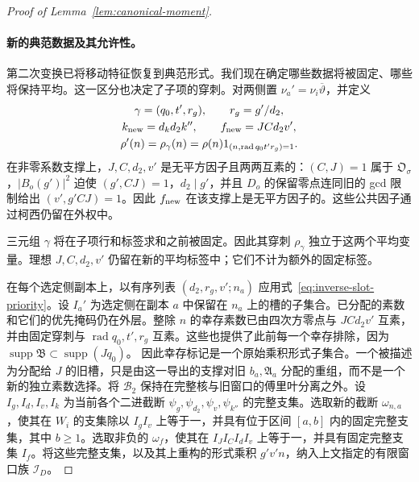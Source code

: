\documentclass[11pt,a4paper]{article}
\numberwithin{equation}{section}
\numberwithin{figure}{section}
\theoremstyle{definition}
\theoremstyle{remark}
\begin{document}
\begin{proof}[Proof of Lemma~\ref{lem:canonical-moment}]
\paragraph{新的典范数据及其允许性。}
第二次变换已将移动特征恢复到典范形式。我们现在确定哪些数据将被固定、哪些将保持平均。这一区分也决定了子项的穿刺。对两侧置 \(\nu_a'=\nu_i\overline\vartheta\)，并定义
\begin{equation}\label{eq:canonical-child-data}
 \begin{gathered}
 \gamma=(q_0,t',r_g),\qquad r_g=g'/d_2,\\
 k_{\rm new}=d_kd_2k'',\qquad f_{\rm new}=JCd_2v',\\
 \rho'(n)=\rho_\gamma(n)=\rho(n)1_{(n,\operatorname{rad}q_0t'r_g)=1}.
 \end{gathered}
\end{equation}
在非零系数支撑上，\(J,C,d_2,v'\) 是无平方因子且两两互素的：\((C,J)=1\) 属于 \(\mathfrak O_\sigma\)，\(|B_o(g')|^2\) 迫使 \((g',CJ)=1\)，\(d_2\mid g'\)，并且 \(D_o\) 的保留零点连同旧的 gcd 限制给出
\((v',g'CJ)=1\)。因此 \(f_{\rm new}\) 在该支撑上是无平方因子的。这些公共因子通过柯西仍留在外权中。

三元组 \(\gamma\) 将在子项行和标签求和之前被固定。因此其穿刺 \(\rho_\gamma\) 独立于这两个平均变量。理想 \(J,C,d_2,v'\) 仍留在新的平均标签中；它们不计为额外的固定标签。

在每个选定侧副本上，以有序列表 \((d_2,r_g,v';n_a)\) 应用式~\eqref{eq:inverse-slot-priority}。设 \(I_a'\) 为选定侧在副本 \(a\) 中保留在 \(n_a\) 上的槽的子集合。已分配的素数和它们的优先掩码仍在外层。整除 \(n\) 的幸存素数已由四次方零点与 \(JCd_2v'\) 互素，并由固定穿刺与
\(\operatorname{rad}q_0,t',r_g\) 互素。这些也提供了此前每一个幸存排除，因为
\(\operatorname{supp}\mathfrak B\subset\operatorname{supp}(Jq_0)\)。
因此幸存标记是一个原始乘积形式子集合。一个被描述为分配给 \(J\) 的旧槽，只是由这一导出的支撑对旧 \(b_a,\mathfrak A_a\) 分配的重组，而不是一个新的独立素数选择。将 \(\mathcal B_2\) 保持在完整核与旧窗口的傅里叶分离之外。设 \(I_g,I_d,I_v,I_k\) 为当前各个二进截断 \(\psi_g,\psi_{d_2},\psi_v,\psi_{k''}\) 的完整支集。选取新的截断 \(\omega_{n,a}\)，使其在 \(W_i\) 的支集除以 \(I_gI_v\) 上等于一，并具有位于区间 \([a,b]\) 内的固定完整支集，其中 \(b\ge1\)。选取非负的 \(\omega_f\)，使其在 \(I_JI_CI_dI_v\) 上等于一，并具有固定完整支集 \(I_f\)。将这些完整支集，以及其上重构的形式乘积 \(g'v'n\)，纳入上文指定的有限窗口族 \(\mathcal I_D\)。


\end{proof}
\end{document}

